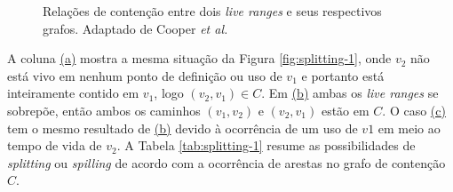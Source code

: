 \documentclass[
	12pt,				%
	openright,			%
	oneside,			%
	a4paper,			%
	tccpreliminar,			%
	]{ABNT-DC-UEL}
\begin{document}
\begin{figure}[ht]
\begin{subfigure}[b]{0.3\textwidth}
        \caption{}
        \label{fig:splitting-2:a}
    \end{subfigure}
    \begin{subfigure}[b]{0.3\textwidth}
        \centering
        \caption{}
        \label{fig:splitting-2:b}
    \end{subfigure}
    \begin{subfigure}[b]{0.3\textwidth}
        \centering
        \caption{}
        \label{fig:splitting-2:c}
    \end{subfigure}
    \caption{Relações de contenção entre dois \textit{live ranges} e seus respectivos grafos. Adaptado de Cooper \textit{et al.} \cite{cooper:98}}
    \label{fig:splitting-2}
\end{figure}

A coluna \hyperref[fig:splitting-2:a]{(a)} mostra a mesma situação da Figura \ref{fig:splitting-1}, onde $v_2$ não está vivo em nenhum ponto de definição ou uso de $v_1$ e portanto está inteiramente contido em $v_1$, logo $(v_2,v_1) \in C$. Em \hyperref[fig:splitting-2:b]{(b)} ambas os \textit{live ranges} se sobrepõe, então ambos os caminhos $(v_1,v_2)$ e $(v_2,v_1)$ estão em $C$. O caso \hyperref[fig:splitting-2:c]{(c)} tem o mesmo resultado de \hyperref[fig:splitting-2:b]{(b)} devido à ocorrência de um uso de $v1$ em meio ao tempo de vida de $v_2$. A Tabela \ref{tab:splitting-1} resume as possibilidades de \textit{splitting} ou \textit{spilling} de acordo com a ocorrência de arestas no grafo de contenção $C$.
\end{document}

